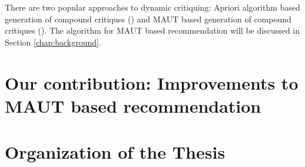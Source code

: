 There are two popular approaches to dynamic critiquing: Apriori algorithm based generation of compound critiques (\cite{mccarthy2004dynamic}) and MAUT based generation of compound critiques (\cite{mautPaper}). The algorithm for MAUT based recommendation will be discussed in Section \ref{chap:background}.


\section{Our contribution: Improvements to MAUT based recommendation}
\section{Organization of the Thesis}
